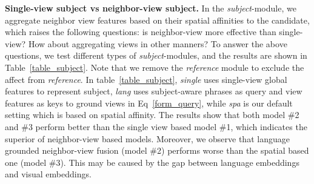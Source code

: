 \documentclass[sigconf]{acmart}
\begin{document}
\noindent\textbf{Single-view subject vs neighbor-view subject.} In the \textit{subject}-module, we aggregate neighbor view features based on their spatial affinities to the candidate, which raises the following questions: is neighbor-view more effective than single-view? How about aggregating views in other manners? 
To answer the above questions, we test different types of \textit{subject}-modules, and the results are shown in Table~\ref{table_subject}. Note that we remove the \textit{reference} module to exclude the affect from \textit{reference}.
In table~\ref{table_subject}, \textit{single} uses single-view global features to represent subject,
\textit{lang} uses subject-aware phrases  as query and view features as keys to ground views in Eq~\eqref{form_query}, while \textit{spa} is our default setting which is based on spatial affinity. 
The results show that both model \#2 and \#3 perform better than the single view based model \#1, which indicates the superior of neighbor-view based models. 
Moreover, we observe that language grounded neighbor-view fusion (model \#2) performs worse than the spatial based one (model \#3). This may be caused by the gap between language embeddings and visual embeddings.

\begin{table}[htbp]
	\caption{Different types of \textit{subject}-modules, \textit{single} denotes single-view, \textit{lang} denotes aggregating views using language as query while \textit{spa} denotes using spatial affinity.}
	\label{table_subject}
	\vspace{-3mm}
	\centering
\end{table}
\end{document}
